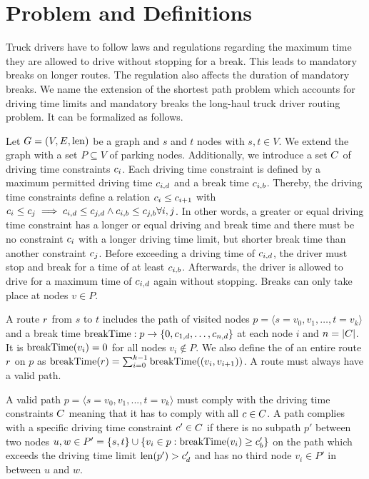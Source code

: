 \chapter{Problem and Definitions}\label{chapter:problem_definitions}
Truck drivers have to follow laws and regulations regarding the maximum time they are allowed to drive without stopping for a break. This leads to mandatory breaks on longer routes. The regulation also affects the duration of mandatory breaks. We name the extension of the shortest path problem which accounts for driving time limits and mandatory breaks the long-haul truck driver routing problem. It can be formalized as follows.

Let $G=(V,E,\operatorname{len})$ be a graph and $s$ and $t$ nodes with $s,t \in V$. We extend the graph with a set $P \subseteq V$ of parking nodes. Additionally, we introduce a set $C$ of driving time constraints $c_i$. Each driving time constraint is defined by a maximum permitted driving time $c_{i,d}$ and a break time $c_{i,b}$. Thereby, the driving time constraints define a relation $c_i \le c_{i+1}$ with $c_i \le c_j \implies c_{i,d} \le c_{j,d} \land  c_{i,b} \le c_{j,b} \forall i,j$. In other words, a greater or equal driving time constraint has a longer or equal driving and break time and there must be no constraint $c_i$ with a longer driving time limit, but shorter break time than another constraint $c_j$. Before exceeding a driving time of $c_{i,d}$, the driver must stop and break for a time of at least $c_{i,b}$. Afterwards, the driver is allowed to drive for a maximum time of $c_{i,d}$ again without stopping. Breaks can only take place at nodes $v \in P$.

A route $r$ from $s$ to $t$ includes the path of visited nodes $p = \langle s=v_0,v_1,\dots,t=v_k \rangle$ and a break time $\operatorname{breakTime}: p \rightarrow \{0,c_{1,d},\dots,c_{n,d}\}$ at each node $i$ and $n = |C|$. It is $\operatorname{breakTime}(v_i) = 0$ for all nodes $v_i \notin P$. We also define the \breakTime of an entire route $r$ on $p$ as $\operatorname{breakTime}(r) = \sum_{i=0}^{k-1}{\operatorname{breakTime}((v_i,v_{i+1}))}$. A route must always have a valid path.

\begin{definition}
	A valid path $p = \langle s=v_0,v_1,...,t=v_k \rangle$ must comply with the driving time constraints $C$ meaning that it has to comply with all $c \in C$. A path complies with a specific driving time constraint $c' \in C$ if there is no subpath $p'$ between two nodes $u,w \in P' = \{s,t\} \cup \{v_i \in p : \operatorname{breakTime}(v_i) \ge c'_{b}\}$ on the path which exceeds the driving time limit $\operatorname{len}(p') > c'_{d}$ and has no third node $v_i \in P'$ in between $u$ and $w$.
\end{definition}

